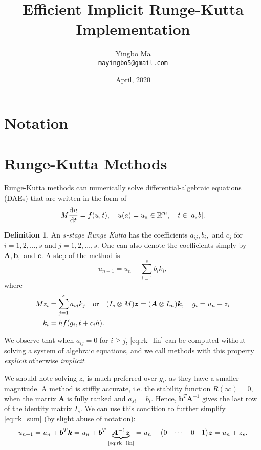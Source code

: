 \documentclass[a4paper,9pt]{article}
\theoremstyle{definition}
\newtheorem{definition}{Definition}[section]
\theoremstyle{remark}
\begin{document}
\author{Yingbo Ma\\
        \tt{mayingbo5@gmail.com}}
\title{Efficient Implicit Runge-Kutta Implementation}
\date{April, 2020}

\maketitle

\section{Notation}

\section{Runge-Kutta Methods}
Runge-Kutta methods can numerically solve differential-algebraic equations (DAEs)
that are written in the form of
\begin{equation}
  M \dv{u}{t} = f(u, t),\quad u(a)=u_a \in \mathbb{R}^m, \quad t\in [a, b].
\end{equation}

\begin{definition} \label{def:rk}
  An \emph{$s$-stage Runge Kutta} has the coefficients $a_{ij}, b_i,$ and $c_j$
  for $i=1,2,\dots,s$ and $j=1,2,\dots,s$. One can also denote the coefficients
  simply by $\bm{A}, \bm{b},$ and $\bm{c}$. A step of the method is
  \begin{equation} \label{eq:rk_sum}
    u_{n+1} = u_n + \sum_{i=1}^s b_i k_i,
  \end{equation}
  where
  \begin{align} \label{eq:rk_lin}
    M z_i &= \sum_{j=1}^s a_{ij}k_j\qq{or} (I_s \otimes M) \bm{z} =
    (\bm{A}\otimes I_m)\bm{k}, \quad g_i = u_n + z_i \\
    k_i &= hf(g_i, t+c_ih).
  \end{align}
\end{definition}

We observe that when $a_{ij} = 0$ for $i\ge j$, \cref{eq:rk_lin} can be computed
without solving a system of algebraic equations, and we call methods with this
property \emph{explicit} otherwise \emph{implicit}.

We should note solving $z_i$ is much preferred over $g_i$, as they have a
smaller magnitude. A method is stiffly accurate, i.e. the stability function
$R(\infty) = 0$, when the matrix $\bm{A}$ is fully ranked and $a_{si} = b_i$.
Hence, $\bm{b}^T\bm{A}^{-1}$ gives the last row of the identity matrix $I_s$. We
can use this condition to further simplify \cref{eq:rk_sum} (by slight abuse of
notation):
\begin{equation} \label{eq:rk_sim}
  u_{n+1} = u_n + \bm{b}^T\bm{k} = u_n +
  \bm{b}^T\underbrace{\bm{A}^{-1}\bm{z}}_\text{\cref{eq:rk_lin}} = u_n +
  \mqty(0 & \cdots & 0 & 1)\bm{z} = u_n + z_s.
\end{equation}
\end{document}
